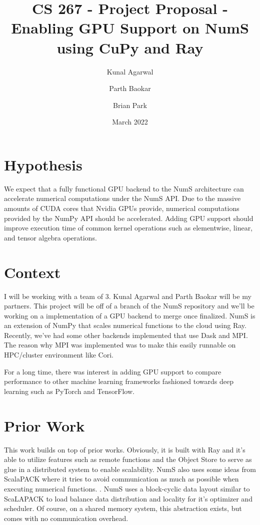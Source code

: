 \documentclass{article}
\title{CS 267 - Project Proposal - Enabling GPU Support on NumS using CuPy and Ray}
\author{Kunal Agarwal}
\author{Parth Baokar}
\author{Brian Park}
\affil{UC Berkeley, Computer Science 267}
\date{March 2022}
\begin{document}
\maketitle


\section{Hypothesis}
We expect that a fully functional GPU backend to the NumS architecture can accelerate numerical computations under the NumS API. Due to the massive amounts of CUDA cores that Nvidia GPUs provide, numerical computations provided by the NumPy API should be accelerated. Adding GPU support should improve execution time of common kernel operations such as elementwise, linear, and tensor algebra operations. 

\section{Context}
I will be working with a team of 3. Kunal Agarwal and Parth Baokar will be my partners. This project will be off of a branch of the NumS repository and we'll be working on a implementation of a GPU backend to merge once finalized. \cite{NumS} NumS is an extension of NumPy that scales numerical functions to the cloud using Ray. Recently, we've had some other backends implemented that use Dask and MPI. The reason why MPI was implemented was to make this easily runnable on HPC/cluster environment like Cori. 

For a long time, there was interest in adding GPU support to compare performance to other machine learning frameworks fashioned towards deep learning such as PyTorch and TensorFlow.

\section{Prior Work}
This work builds on top of prior works. Obviously, it is built with Ray and it's able to utilize features such as remote functions and the Object Store to serve as glue in a distributed system to enable scalability. \cite{DBLP:journals/corr/abs-1712-05889} NumS also uses some ideas from ScalaPACK where it tries to avoid communication as much as possible when executing numerical functions. \cite{10.5555/265932}.  NumS uses a block-cyclic data layout similar to ScaLAPACK to load balance data distribution and locality for it's optimizer and scheduler. Of course, on a shared memory system, this abstraction exists, but comes with no communication overhead. 
\end{document}
